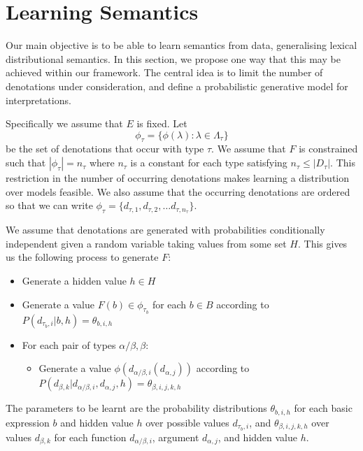 \documentclass{svmult}
\begin{document}

\section{Learning Semantics}
\label{section:distributions}

Our main objective is to be able to learn semantics from data,
generalising lexical distributional semantics. In this section, we
propose one way that this may be achieved within our framework. The
central idea is to limit the number of denotations under
consideration, and define a probabilistic generative model for
interpretations.

Specifically we assume that $E$ is fixed. Let
$$\phi_\tau = \{\phi(\lambda) : \lambda\in \Lambda_\tau\}$$
be the set of denotations that occur with type $\tau$. We assume that
$F$ is constrained such that $|\phi_\tau| = n_\tau$ where $n_\tau$
is a constant for each type satisfying $n_\tau \le |D_\tau|$. This
restriction in the number of occurring denotations makes learning a
distribution over models feasible. We also assume that the occurring
denotations are ordered so that we can write $\phi_\tau =
\{d_{\tau,1}, d_{\tau,2}, \ldots d_{\tau, n_\tau}\}$.


We assume that denotations are generated with probabilities
conditionally independent given a random variable taking values from
some set $H$. This gives us the following process to generate $F$:
\begin{itemize}
\item Generate a hidden value $h\in H$
\item Generate a value $F(b) \in \phi_{\tau_b}$ for each $b\in B$ according to
  $P(d_{\tau_b,i}|b, h) = \theta_{b,i,h}$
\item For each pair of types $\alpha/\beta, \beta$:
\begin{itemize}
\item Generate a value $\phi(d_{\alpha/\beta,i}(d_{\alpha,j}))$
  according to $P(d_{\beta,k}|d_{\alpha/\beta,i}, d_{\alpha,j},h) = \theta_{\beta,i,j,k,h}$
\end{itemize}
\end{itemize}
The parameters to be learnt are the probability distributions
$\theta_{b,i,h}$ for each basic expression $b$ and hidden value $h$
over possible values $d_{\tau_b,i}$, and $\theta_{\beta,i,j,k,h}$ over
values $d_{\beta,k}$ for each function $d_{\alpha/\beta,i}$, argument
$d_{\alpha,j}$, and hidden value $h$.
\end{document}
